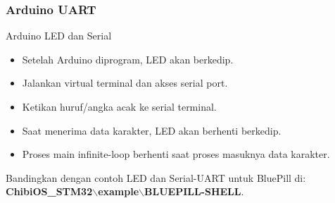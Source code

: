\documentclass[table,dvipsnames]{beamer}
\begin{document}
	\begin{frame}
		\frametitle{Arduino UART}
		\begin{exampleblock}{}
			Arduino LED dan Serial
			\begin{itemize}
				\item Setelah Arduino diprogram, LED akan berkedip.
				\item Jalankan virtual terminal dan akses serial port.
				\item Ketikan huruf/angka acak ke serial terminal.
				\item Saat menerima data karakter, LED akan berhenti berkedip.
				\item Proses main infinite-loop berhenti saat proses masuknya data karakter.
			\end{itemize}
		\end{exampleblock}

		\begin{exampleblock}{}
			Bandingkan dengan contoh LED dan Serial-UART untuk BluePill di:
			\textbf{ChibiOS\_STM32$\backslash$example$\backslash$BLUEPILL-SHELL}.
		\end{exampleblock}
	\end{frame}
\end{document}

